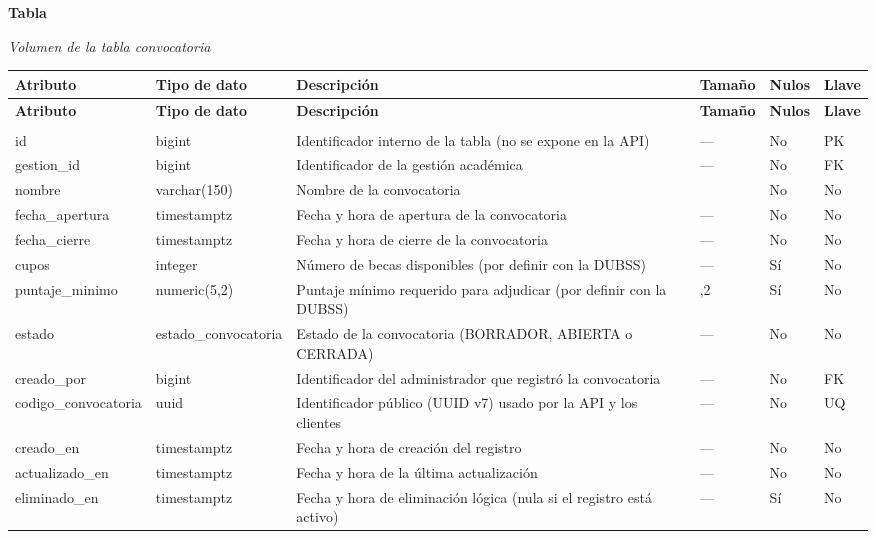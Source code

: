 \label{tab:volumen_convocatoria}
\noindent\textbf{Tabla~\thetable}\par\nopagebreak
\noindent\textit{Volumen de la tabla convocatoria}\par\nopagebreak
\begingroup\small\linespread{1}\selectfont\setlength{\tabcolsep}{4pt}
\begin{longtable}{>{\raggedright\arraybackslash}p{3.4cm} >{\raggedright\arraybackslash}p{2.5cm} >{\raggedright\arraybackslash}p{4.8cm} >{\centering\arraybackslash}p{1.6cm}>{\centering\arraybackslash}p{1.1cm} >{\centering\arraybackslash}p{1.3cm}}
\toprule
\textbf{Atributo} & \textbf{Tipo de dato} & \textbf{Descripción} & \textbf{Tamaño} & \textbf{Nulos} & \textbf{Llave} \\
\midrule
\endfirsthead
\toprule
\textbf{Atributo} & \textbf{Tipo de dato} & \textbf{Descripción} & \textbf{Tamaño} & \textbf{Nulos} & \textbf{Llave} \\
\midrule
\endhead
\endfoot
\bottomrule
\multicolumn{6}{l}{\textit{Nota.} Elaboración propia.} \\
\endlastfoot
id & bigint & Identificador interno de la tabla (no se expone en la API) & — & No & PK \\
gestion\_\allowbreak{}id & bigint & Identificador de la gestión académica & — & No & FK \\
nombre & varchar(150) & Nombre de la convocatoria & 150 & No & No \\
fecha\_\allowbreak{}apertura & timestamptz & Fecha y hora de apertura de la convocatoria & — & No & No \\
fecha\_\allowbreak{}cierre & timestamptz & Fecha y hora de cierre de la convocatoria & — & No & No \\
cupos & integer & Número de becas disponibles (por definir con la DUBSS) & — & Sí & No \\
puntaje\_\allowbreak{}minimo & numeric(5,2) & Puntaje mínimo requerido para adjudicar (por definir con la DUBSS) & 5,2 & Sí & No \\
estado & estado\_\allowbreak{}convocatoria & Estado de la convocatoria (BORRADOR, ABIERTA o CERRADA) & — & No & No \\
creado\_\allowbreak{}por & bigint & Identificador del administrador que registró la convocatoria & — & No & FK \\
codigo\_\allowbreak{}convocatoria & uuid & Identificador público (UUID v7) usado por la API y los clientes & — & No & UQ \\
creado\_\allowbreak{}en & timestamptz & Fecha y hora de creación del registro & — & No & No \\
actualizado\_\allowbreak{}en & timestamptz & Fecha y hora de la última actualización & — & No & No \\
eliminado\_\allowbreak{}en & timestamptz & Fecha y hora de eliminación lógica (nula si el registro está activo) & — & Sí & No \\
\end{longtable}
\endgroup
\addtocounter{table}{-1}

